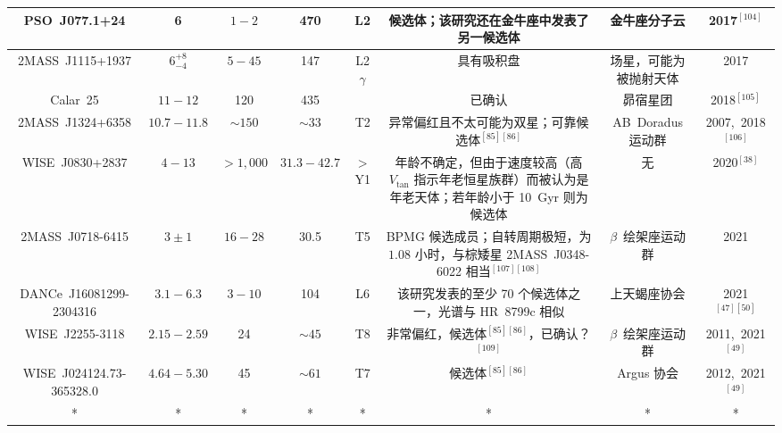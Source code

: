 \begin{table}[ht]
\begin{tabular}{|c|c|c|c|c|c|c|c|}
\hline
PSO~J077.1+24 & 6 & $1-2$ & 470 & L2 & 候选体；该研究还在金牛座中发表了另一候选体 & 金牛座分子云 & 2017$^{[104]}$\\
\hline
2MASS~J1115+1937 & $6^{+8}_{-4}$ & $5-45$ & 147  & L2$\gamma$ & 具有吸积盘  & 场星，可能为被抛射天体 & 2017\\
\hline
Calar~25 & $11-12$ & 120 & 435  &  & 已确认 & 昴宿星团 & 2018$^{[105]}$\\ 
\hline
2MASS~J1324+6358 & $10.7-11.8$ & $\sim150$ & $\sim33$ & T2 & 异常偏红且不太可能为双星；可靠候选体$^{[85][86]}$ & AB~Doradus 运动群 & 2007,~2018$^{[106]}$\\
\hline
WISE~J0830+2837 & $4-13$ & $>1{,}000$ & $31.3-42.7$ & $>$Y1 & 年龄不确定，但由于速度较高（高 $V_{\mathrm{tan}}$ 指示年老恒星族群）而被认为是年老天体；若年龄小于 10~Gyr 则为候选体 & 无 & 2020$^{[38]}$\\
\hline
2MASS~J0718-6415 & $3\pm1$ & $16-28$ & 30.5 & T5 & BPMG 候选成员；自转周期极短，为 $1.08$ 小时，与棕矮星 2MASS~J0348-6022 相当$^{[107][108]}$ & $\beta$~绘架座运动群 & 2021\\
\hline
DANCe~J16081299-2304316 & $3.1-6.3$ & $3-10$ & 104 & L6 & 该研究发表的至少 70 个候选体之一，光谱与 HR~8799c 相似 & 上天蝎座协会 & 2021$^{[47][50]}$\\
\hline
WISE~J2255-3118 & $2.15-2.59$ & 24 & $\sim45$ & T8 & 非常偏红，候选体$^{[85][86]}$，已确认？$^{[109]}$ & $\beta$~绘架座运动群 & 2011,~2021$^{[49]}$\\
\hline
WISE~J024124.73-365328.0 & $4.64-5.30$ & 45 & $\sim61$ & T7 & 候选体$^{[85][86]}$ & Argus 协会 & 2012,~2021$^{[49]}$\\
\hline
* & * & * & * & * & * & * & * \\
\hline
\end{tabular}
\end{table}
